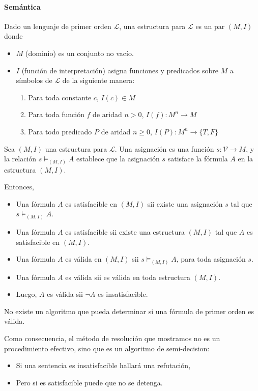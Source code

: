 \paragraph{Semántica}

Dado un lenguaje de primer orden $\mathcal{L}$, una estructura para $\mathcal{L}$ es un par $(M,I)$ donde
\begin{itemize}
  \item $M$ (dominio) es un conjunto no vacío.
  \item $I$ (función de interpretación) asigna funciones y predicados sobre $M$ a símbolos de $\mathcal{L}$ de la siguiente manera:
  \begin{enumerate}
    \item Para toda constante $c$, $I(c) \in M$
    \item Para toda función $f$ de aridad $n > 0$, $I(f): M^n \to M$
    \item Para todo predicado $P$ de aridad $n \geq 0$, $I(P) : M^n \to \{T,F\}$
  \end{enumerate}
\end{itemize}

Sea $(M,I)$ una estructura para $\mathcal{L}$. Una asignación es una función $s:\mathcal{V} \to M$, y la relación $s \models_{(M,I)} A$ establece que la asignación $s$ satisface la fórmula $A$ en la estructura $(M,I)$.

Entonces,
\begin{itemize}
  \item Una fórmula $A$ es satisfacible en $(M,I)$ sii existe una asignación $s$ tal que $s \models_{(M,I)} A$.
  \item Una fórmula $A$ es satisfacible sii existe una estructura $(M,I)$ tal que $A$ es satisfacible en $(M,I)$.
  \item Una fórmula $A$ es válida en $(M,I)$ sii $s \models_{(M,I)} A$, para toda asignación $s$.
  \item Una fórmula $A$ es válida sii es válida en toda estructura $(M,I)$.
  \item Luego, $A$ es válida sii $\lnot A$ es insatisfacible.
\end{itemize}


\begin{teo}
  No existe un algoritmo que pueda determinar si una fórmula de primer orden es válida.

  Como consecuencia, el método de resolución que mostramos no es un procedimiento efectivo, sino que es un algoritmo de semi-decision:
  \begin{itemize}
    \item Si una sentencia es insatisfacible hallará una refutación,
    \item Pero si es satisfacible puede que no se detenga.
  \end{itemize}
\end{teo}



